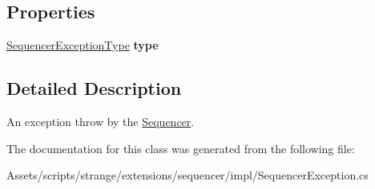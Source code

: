 \subsection*{Properties}
\begin{DoxyCompactItemize}
\item 
\hypertarget{classstrange_1_1extensions_1_1sequencer_1_1impl_1_1_sequencer_exception_a24f94543675745431c8e26addbf6cd4d}{\hyperlink{namespacestrange_1_1extensions_1_1sequencer_1_1api_aeddaacdea22f90d94ab298d24cbce41b}{Sequencer\-Exception\-Type} {\bfseries type}}\label{classstrange_1_1extensions_1_1sequencer_1_1impl_1_1_sequencer_exception_a24f94543675745431c8e26addbf6cd4d}

\end{DoxyCompactItemize}


\subsection{Detailed Description}
An exception throw by the \hyperlink{classstrange_1_1extensions_1_1sequencer_1_1impl_1_1_sequencer}{Sequencer}. 

The documentation for this class was generated from the following file\-:\begin{DoxyCompactItemize}
\item 
Assets/scripts/strange/extensions/sequencer/impl/Sequencer\-Exception.\-cs\end{DoxyCompactItemize}
